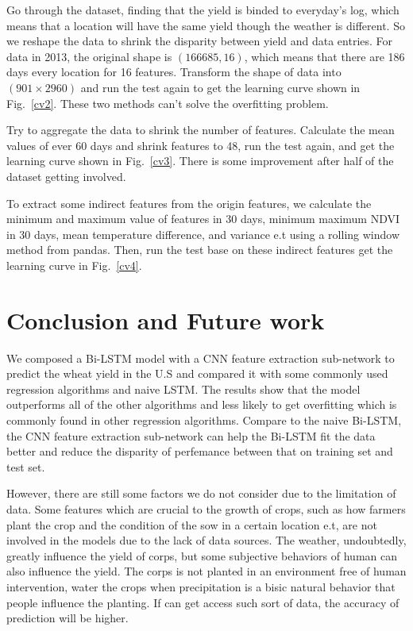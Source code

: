 \documentclass[conference, a4paper]{IEEEtran}
\begin{document}
  Go through the dataset, finding that the yield is binded to everyday's log, which means that a location will have the same yield though the weather is different. So we reshape the data to shrink the disparity between yield and data entries. For data in 2013, the original shape is $(166685,16)$, which means that there are 186 days every location for 16 features. Transform the shape of data into $(901\times2960)$ and run the test again to get the learning curve shown in Fig.~\ref{cv2}. These two methods can't solve the overfitting problem.

  Try to aggregate the data to shrink the number of features. Calculate the mean values of ever 60 days and shrink features to 48, run the test again, and get the learning curve shown in Fig.~\ref{cv3}. There is some improvement after half of the dataset getting involved.

  To extract some indirect features from the origin features, we calculate the minimum and maximum value of features in 30 days, minimum maximum NDVI in 30 days, mean temperature difference, and variance e.t using a rolling window method from pandas. Then, run the test base on these indirect features get the learning curve in Fig.~\ref{cv4}.


\section{Conclusion and Future work} \label{sec:con}
  We composed a Bi-LSTM model with a CNN feature extraction sub-network to predict the wheat yield in the U.S and compared it with some commonly used regression algorithms and naive LSTM. The results show that the model outperforms all of the other algorithms and less likely to get overfitting which is commonly found in other regression algorithms. Compare to the naive Bi-LSTM, the CNN feature extraction sub-network can help the Bi-LSTM fit the data better and reduce the disparity of perfemance between that on training set and test set.
  
  However, there are still some factors we do not consider due to the limitation of data. Some features which are crucial to the growth of crops, such as how farmers plant the crop and the condition of the sow in a certain location e.t, are not involved in the models due to the lack of data sources. The weather, undoubtedly, greatly influence the yield of corps, but some subjective behaviors of human can also influence the yield. The corps is not planted in an environment free of human intervention, water the crops when precipitation is a bisic natural behavior that people influence the planting. If can get access such sort of data, the accuracy of prediction will be higher. 



\end{document}
